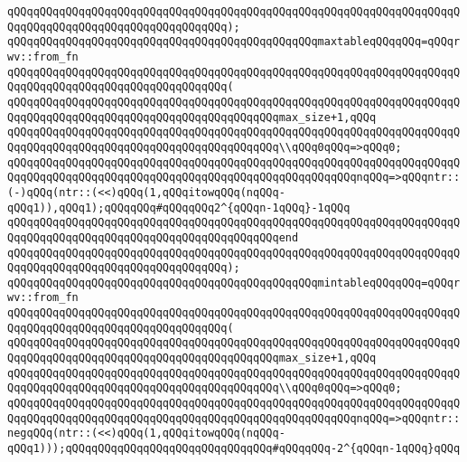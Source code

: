 \verb|qQQqqQQqqQQqqQQqqQQqqQQqqQQqqQQqqQQqqQQqqQQqqQQqqQQqqQQqqQQqqQQqqQQqqQQqqQQqqQQqqQQqqQQqqQQqqQQqqQQqqQQq);|\newline
\newline
\verb|qQQqqQQqqQQqqQQqqQQqqQQqqQQqqQQqqQQqqQQqqQQqqQQqmaxtableqQQqqQQq=qQQqrwv::from_fn|\newline
\verb|qQQqqQQqqQQqqQQqqQQqqQQqqQQqqQQqqQQqqQQqqQQqqQQqqQQqqQQqqQQqqQQqqQQqqQQqqQQqqQQqqQQqqQQqqQQqqQQqqQQqqQQq(|\newline
\verb|qQQqqQQqqQQqqQQqqQQqqQQqqQQqqQQqqQQqqQQqqQQqqQQqqQQqqQQqqQQqqQQqqQQqqQQqqQQqqQQqqQQqqQQqqQQqqQQqqQQqqQQqqQQqqQQqmax_size+1,qQQq|\newline
\newline
\verb|qQQqqQQqqQQqqQQqqQQqqQQqqQQqqQQqqQQqqQQqqQQqqQQqqQQqqQQqqQQqqQQqqQQqqQQqqQQqqQQqqQQqqQQqqQQqqQQqqQQqqQQqqQQqqQQq\\qQQq0qQQq=>qQQq0;|\newline
\verb|qQQqqQQqqQQqqQQqqQQqqQQqqQQqqQQqqQQqqQQqqQQqqQQqqQQqqQQqqQQqqQQqqQQqqQQqqQQqqQQqqQQqqQQqqQQqqQQqqQQqqQQqqQQqqQQqqQQqqQQqqQQqnqQQq=>qQQqntr::(-)qQQq(ntr::(<<)qQQq(1,qQQqitowqQQq(nqQQq-qQQq1)),qQQq1);qQQqqQQq#qQQqqQQq2^{qQQqn-1qQQq}-1qQQq|\newline
\verb|qQQqqQQqqQQqqQQqqQQqqQQqqQQqqQQqqQQqqQQqqQQqqQQqqQQqqQQqqQQqqQQqqQQqqQQqqQQqqQQqqQQqqQQqqQQqqQQqqQQqqQQqqQQqqQQqend|\newline
\verb|qQQqqQQqqQQqqQQqqQQqqQQqqQQqqQQqqQQqqQQqqQQqqQQqqQQqqQQqqQQqqQQqqQQqqQQqqQQqqQQqqQQqqQQqqQQqqQQqqQQqqQQq);|\newline
\newline
\verb|qQQqqQQqqQQqqQQqqQQqqQQqqQQqqQQqqQQqqQQqqQQqqQQqmintableqQQqqQQq=qQQqrwv::from_fn|\newline
\verb|qQQqqQQqqQQqqQQqqQQqqQQqqQQqqQQqqQQqqQQqqQQqqQQqqQQqqQQqqQQqqQQqqQQqqQQqqQQqqQQqqQQqqQQqqQQqqQQqqQQqqQQq(|\newline
\verb|qQQqqQQqqQQqqQQqqQQqqQQqqQQqqQQqqQQqqQQqqQQqqQQqqQQqqQQqqQQqqQQqqQQqqQQqqQQqqQQqqQQqqQQqqQQqqQQqqQQqqQQqqQQqqQQqmax_size+1,qQQq|\newline
\newline
\verb|qQQqqQQqqQQqqQQqqQQqqQQqqQQqqQQqqQQqqQQqqQQqqQQqqQQqqQQqqQQqqQQqqQQqqQQqqQQqqQQqqQQqqQQqqQQqqQQqqQQqqQQqqQQqqQQq\\qQQq0qQQq=>qQQq0;|\newline
\verb|qQQqqQQqqQQqqQQqqQQqqQQqqQQqqQQqqQQqqQQqqQQqqQQqqQQqqQQqqQQqqQQqqQQqqQQqqQQqqQQqqQQqqQQqqQQqqQQqqQQqqQQqqQQqqQQqqQQqqQQqqQQqnqQQq=>qQQqntr::negqQQq(ntr::(<<)qQQq(1,qQQqitowqQQq(nqQQq-qQQq1)));qQQqqQQqqQQqqQQqqQQqqQQqqQQqqQQq#qQQqqQQq-2^{qQQqn-1qQQq}qQQq|\newline
